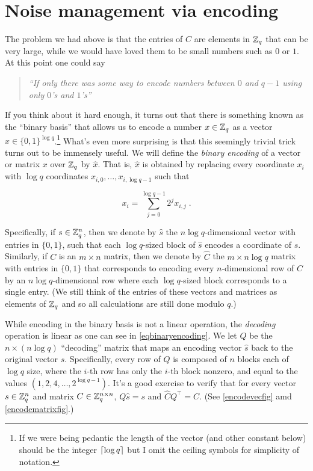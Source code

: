 \section{Noise management via encoding}\label{17-Noise-management-via-e}

The problem we had above is that the entries of \(C\) are elements in
\({\mathbb{Z}}_q\) that can be very large, while we would have loved them to be
small numbers such as \(0\) or \(1\). At this point one could say

\begin{quote}
\emph{``If only there was some way to encode numbers between \(0\) and
\(q-1\) using only \(0\)'s and \(1\)'s''}
\end{quote}

If you think about it hard enough, it turns out that there is something
known as the ``binary basis'' that allows us to encode a number
\(x\in{\mathbb{Z}}_q\) as a vector \(\hat{x}\in\{0,1\}^{\log q}\).\footnote{If we
  were being pedantic the length of the vector (and other constant
  below) should be the integer \(\lceil \log q \rceil\) but I omit the ceiling
  symbols for simplicity of notation.} What's even more surprising is
that this seemingly trivial trick turns out to be immensely useful. We
will define the \emph{binary encoding} of a vector or matrix \(x\) over
\({\mathbb{Z}}_q\) by \(\hat{x}\). That is, \(\hat{x}\) is obtained by replacing
every coordinate \(x_i\) with \(\log q\) coordinates
\(x_{i,0},\ldots,x_{i,\log q-1}\) such that

\[x_i = \sum_{j=0}^{\log q-1}2^j x_{i,j} \;. \label{eqbinaryencoding}\]

Specifically, if \(s\in {\mathbb{Z}}_q^n\), then we denote by \(\hat{s}\) the
\(n\log q\)-dimensional vector with entries in \(\{0,1\}\), such that
each \(\log q\)-sized block of \(\hat{s}\) encodes a coordinate of
\(s\). Similarly, if \(C\) is an \(m\times n\) matrix, then we denote by
\(\hat{C}\) the \(m\times n\log q\) matrix with entries in \(\{0,1\}\)
that corresponds to encoding every \(n\)-dimensional row of \(C\) by an
\(n\log q\)-dimensional row where each \(\log q\)-sized block
corresponds to a single entry. (We still think of the entries of these
vectors and matrices as elements of \({\mathbb{Z}}_q\) and so all calculations are
still done modulo \(q\).)

While encoding in the binary basis is not a linear operation, the
\emph{decoding} operation is linear as one can see in
\eqref{eqbinaryencoding}. We let \(Q\) be the \(n \times (n\log q)\)
``decoding'' matrix that maps an encoding vector \(\hat{s}\) back to the
original vector \(s\). Specifically, every row of \(Q\) is composed of
\(n\) blocks each of \(\log q\) size, where the \(i\)-th row has only
the \(i\)-th block nonzero, and equal to the values
\((1,2,4,\ldots,2^{\log q-1})\). It's a good exercise to verify that for
every vector \(s\in {\mathbb{Z}}_q^n\) and matrix \(C\in {\mathbb{Z}}_q^{n\times n}\),
\(Q\hat{s}=s\) and \(\hat{C}Q^\top =C\). (See \cref{encodevecfig} amd
\cref{encodematrixfig}.)

